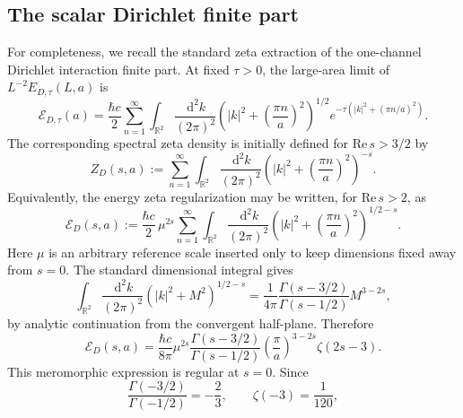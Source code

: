 \documentclass[11pt]{article}
\providecommand{\R}{\mathbb{R}}
\providecommand{\dd}{\,\mathrm{d}}
\providecommand{\hbarc}{\hbar c}
\providecommand{\abs}[1]{\left\lvert #1\right\rvert}
\providecommand{\paren}[1]{\left(#1\right)}
\providecommand{\EDtau}{E_{D,\tau}}
\numberwithin{equation}{section}
\begin{document}
\subsection{The scalar Dirichlet finite part}
\label{subsec:scalar-dirichlet-finite-part-section06}

For completeness, we recall the standard zeta extraction of the one-channel
Dirichlet interaction finite part.  At fixed \(\tau>0\), the large-area limit
of \(L^{-2}\EDtau(L,a)\) is
\begin{equation}
\label{eq:large-area-Dirichlet-heat-regulated-density}
    \mathcal E_{D,\tau}(a)
    =
    \frac{\hbarc}{2}
    \sum_{n=1}^{\infty}
    \int_{\R^2}\frac{\dd^2k}{(2\pi)^2}
    \paren{\abs{k}^2+\paren{\frac{\pi n}{a}}^2}^{1/2}
    e^{-\tau\left(\abs{k}^2+(\pi n/a)^2\right)} .
\end{equation}
The corresponding spectral zeta density is initially defined for
\(\mathrm{Re}\,s>3/2\) by
\begin{equation}
\label{eq:ZD-s-def-section06}
    Z_D(s,a)
    :=
    \sum_{n=1}^{\infty}
    \int_{\R^2}\frac{\dd^2k}{(2\pi)^2}
    \paren{\abs{k}^2+\paren{\frac{\pi n}{a}}^2}^{-s} .
\end{equation}
Equivalently, the energy zeta regularization may be written, for
\(\mathrm{Re}\,s>2\), as
\begin{equation}
\label{eq:ED-zeta-regularized-section06}
    \mathcal E_D(s,a)
    :=
    \frac{\hbarc}{2}\,\mu^{2s}
    \sum_{n=1}^{\infty}
    \int_{\R^2}\frac{\dd^2k}{(2\pi)^2}
    \paren{\abs{k}^2+\paren{\frac{\pi n}{a}}^2}^{1/2-s} .
\end{equation}
Here \(\mu\) is an arbitrary reference scale inserted only to keep dimensions
fixed away from \(s=0\).  The standard dimensional integral gives
\begin{equation}
\label{eq:dimensional-integral-section06}
    \int_{\R^2}\frac{\dd^2k}{(2\pi)^2}
    \paren{\abs{k}^2+M^2}^{1/2-s}
    =
    \frac{1}{4\pi}
    \frac{\Gamma(s-3/2)}{\Gamma(s-1/2)}
    M^{3-2s},
\end{equation}
by analytic continuation from the convergent half-plane.  Therefore
\begin{equation}
\label{eq:ED-zeta-evaluated-section06}
    \mathcal E_D(s,a)
    =
    \frac{\hbarc}{8\pi}
    \mu^{2s}
    \frac{\Gamma(s-3/2)}{\Gamma(s-1/2)}
    \paren{\frac{\pi}{a}}^{3-2s}
    \zeta(2s-3).
\end{equation}
This meromorphic expression is regular at \(s=0\).  Since
\begin{equation}
\label{eq:gamma-zeta-values-section06}
    \frac{\Gamma(-3/2)}{\Gamma(-1/2)}=-\frac23,
    \qquad
    \zeta(-3)=\frac{1}{120},
\end{equation}
\end{document}
